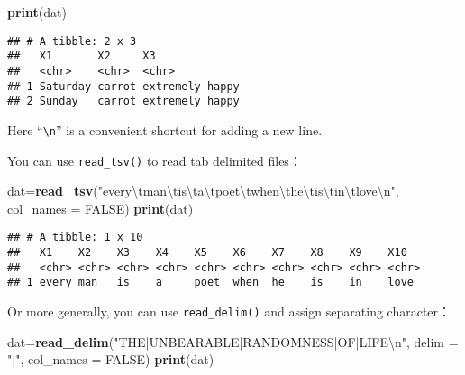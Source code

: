 \documentclass[
]{article}
\newenvironment{Shaded}{\begin{snugshade}}{\end{snugshade}}
\newcommand{\CharTok}[1]{\textcolor[rgb]{0.31,0.60,0.02}{#1}}
\newcommand{\DataTypeTok}[1]{\textcolor[rgb]{0.13,0.29,0.53}{#1}}
\newcommand{\KeywordTok}[1]{\textcolor[rgb]{0.13,0.29,0.53}{\textbf{#1}}}
\newcommand{\NormalTok}[1]{#1}
\newcommand{\OtherTok}[1]{\textcolor[rgb]{0.56,0.35,0.01}{#1}}
\newcommand{\StringTok}[1]{\textcolor[rgb]{0.31,0.60,0.02}{#1}}
\begin{document}
\begin{Shaded}
\begin{Highlighting}[]
\KeywordTok{print}\NormalTok{(dat)}
\end{Highlighting}
\end{Shaded}

\begin{verbatim}
## # A tibble: 2 x 3
##   X1       X2     X3             
##   <chr>    <chr>  <chr>          
## 1 Saturday carrot extremely happy
## 2 Sunday   carrot extremely happy
\end{verbatim}

Here ``\texttt{\textbackslash{}n}'' is a convenient shortcut for adding
a new line.

You can use \texttt{read\_tsv()} to read tab delimited files：

\begin{Shaded}
\begin{Highlighting}[]
\NormalTok{dat=}\KeywordTok{read_tsv}\NormalTok{(}\StringTok{"every}\CharTok{\textbackslash{}t}\StringTok{man}\CharTok{\textbackslash{}t}\StringTok{is}\CharTok{\textbackslash{}t}\StringTok{a}\CharTok{\textbackslash{}t}\StringTok{poet}\CharTok{\textbackslash{}t}\StringTok{when}\CharTok{\textbackslash{}t}\StringTok{he}\CharTok{\textbackslash{}t}\StringTok{is}\CharTok{\textbackslash{}t}\StringTok{in}\CharTok{\textbackslash{}t}\StringTok{love}\CharTok{\textbackslash{}n}\StringTok{"}\NormalTok{, }\DataTypeTok{col_names =} \OtherTok{FALSE}\NormalTok{)}
\KeywordTok{print}\NormalTok{(dat)}
\end{Highlighting}
\end{Shaded}

\begin{verbatim}
## # A tibble: 1 x 10
##   X1    X2    X3    X4    X5    X6    X7    X8    X9    X10  
##   <chr> <chr> <chr> <chr> <chr> <chr> <chr> <chr> <chr> <chr>
## 1 every man   is    a     poet  when  he    is    in    love
\end{verbatim}

Or more generally, you can use \texttt{read\_delim()} and assign
separating character：

\begin{Shaded}
\begin{Highlighting}[]
\NormalTok{dat=}\KeywordTok{read_delim}\NormalTok{(}\StringTok{"THE|UNBEARABLE|RANDOMNESS|OF|LIFE}\CharTok{\textbackslash{}n}\StringTok{"}\NormalTok{, }\DataTypeTok{delim =} \StringTok{"|"}\NormalTok{, }\DataTypeTok{col_names =} \OtherTok{FALSE}\NormalTok{)}
\KeywordTok{print}\NormalTok{(dat)}
\end{Highlighting}
\end{Shaded}
\end{document}
